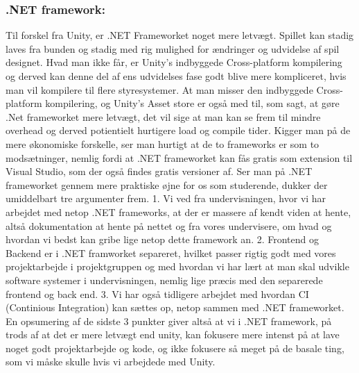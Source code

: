 \subsubsection{.NET framework:}
Til forskel fra Unity, er .NET Frameworket noget mere letvægt. Spillet kan stadig laves fra bunden og stadig med rig mulighed for ændringer og udvidelse af spil designet. Hvad man ikke får, er Unity's indbyggede Cross-platform kompilering og derved kan denne del af ens udvidelses fase godt blive mere kompliceret, hvis man vil kompilere til flere styresystemer. At man misser den indbyggede Cross-platform kompilering, og Unity's Asset store er også med til, som sagt, at gøre .Net frameworket mere letvægt, det vil sige at man kan se frem til mindre overhead og derved potientielt hurtigere load og compile tider.
Kigger man på de mere økonomiske forskelle, ser man hurtigt at de to frameworks er som to modsætninger, nemlig fordi at .NET frameworket kan fås gratis som extension til Visual Studio, som der også findes gratis versioner af.  
Ser man på .NET frameworket gennem mere praktiske øjne for os som studerende, dukker der umiddelbart tre argumenter frem.
1. Vi ved fra undervisningen, hvor vi har arbejdet med netop .NET frameworks, at der er massere af kendt viden at hente, altså dokumentation at hente på nettet og fra vores undervisere, om hvad og hvordan vi bedst kan gribe lige netop dette framework an.
2. Frontend og Backend er i .NET framworket separeret, hvilket passer rigtig godt med vores projektarbejde i projektgruppen og med hvordan vi har lært at man skal udvikle software systemer i undervisningen, nemlig lige præcis med den separerede frontend og back end.
3. Vi har også tidligere arbejdet med hvordan CI (Continious Integration) kan sættes op, netop sammen med .NET frameworket.
En opsumering af de sidste 3 punkter giver altså at vi i .NET framework, på trods af at det er mere letvægt end unity, kan fokusere mere intenst på at lave noget godt projektarbejde og kode, og ikke fokusere så meget på de basale ting, som vi måske skulle hvis vi arbejdede med Unity.\cite{Microsoft.com}

